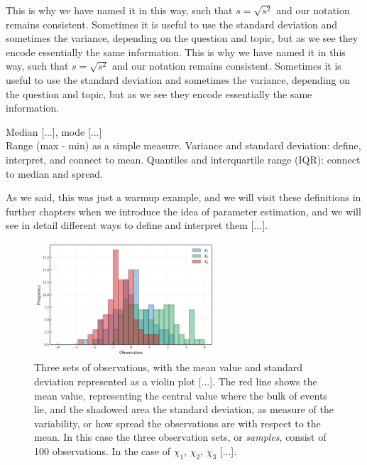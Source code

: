 \documentclass{book}
\begin{document}
\medskip

This is why we have named it in this way, such that $s = \sqrt{s^{2}}$ and our notation remains consistent. Sometimes it is useful to use the standard deviation and sometimes the variance, depending on the question and topic, but as we see they encode essentially the same information. This is why we have named it in this way, such that $s = \sqrt{s^{2}}$ and our notation remains consistent. Sometimes it is useful to use the standard deviation and sometimes the variance, depending on the question and topic, but as we see they encode essentially the same information.

Median [...], mode [...] \\

Range (max - min) as a simple measure. Variance and standard deviation: define, interpret, and connect to mean. Quantiles and interquartile range (IQR): connect to median and spread.

\medskip

As we said, this was just a warmup example, and we will visit these definitions in further chapters when we introduce the idea of parameter estimation, and we will see in detail different ways to define and interpret them [...].

\begin{figure}[ht]
    \centering
    \includegraphics[width=0.6\textwidth]{figures/chapter1/mean_std_hist.png}
    \caption{Three sets of observations, with the mean value and standard deviation represented as a violin plot [...]. The red line shows the mean value, representing the central value where the bulk of events lie, and the shadowed area the standard deviation, as measure of the variability, or how spread the observations are with respect to the mean. In this case the three observation sets, or \textit{samples}, consist of 100 observations. In the case of $\chi_1$, $\chi_2$, $\chi_3$ [...].}
    \label{fig:histogram1}
\end{figure}
\end{document}
